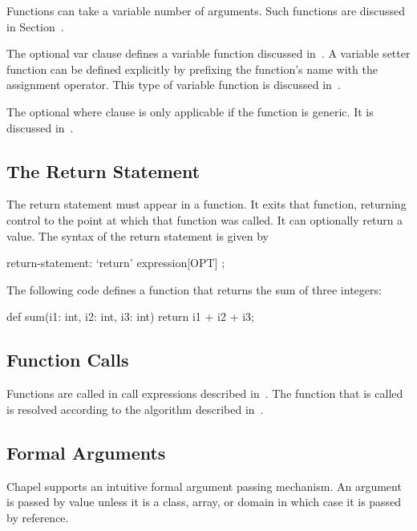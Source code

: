 Functions can take a variable number of arguments.  Such functions are
discussed in Section~.

The optional var clause defines a variable function discussed
in~.  A variable setter function can be
defined explicitly by prefixing the function's name with the
assignment operator.  This type of variable function is discussed
in~.

The optional where clause is only applicable if the function is
generic.  It is discussed in~.

\subsection{The Return Statement}
\label{The_Return_Statement}

The return statement must appear in a function.  It exits that
function, returning control to the point at which that function was
called.  It can optionally return a value.  The syntax of the return
statement is given by
\begin{syntax}
return-statement:
  `return' expression[OPT] ;
\end{syntax}

\begin{example}
The following code defines a function that returns the sum of three
integers:
\begin{chapel}
def sum(i1: int, i2: int, i3: int)
  return i1 + i2 + i3;
\end{chapel}
\end{example}

\subsection{Function Calls}
\label{Function_Calls}

Functions are called in call expressions described
in~.  The function that is called is resolved
according to the algorithm described in~.

\subsection{Formal Arguments}
\label{Formal_Arguments}

Chapel supports an intuitive formal argument passing mechanism.  An
argument is passed by value unless it is a class, array, or domain in
which case it is passed by reference.

